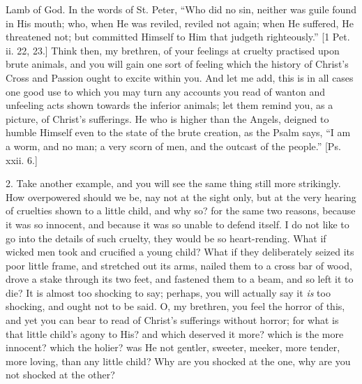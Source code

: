 Lamb of God. In the words of St. Peter, ``Who did no sin, neither
was guile found in His mouth; who, when He was reviled, reviled not
again; when He suffered, He threatened not; but committed Himself to
Him that judgeth righteously.'' [1 Pet. ii. 22, 23.] Think then,
my brethren, of your feelings at cruelty practised upon brute animals,
and you will gain one sort of feeling which the history of Christ's
Cross and Passion ought to excite within you. And let me add, this is
in all cases one good use to which you may turn any accounts you read
of wanton and unfeeling acts shown towards the inferior animals; let
them remind you, as a picture, of Christ's sufferings. He who is
higher than the Angels, deigned to humble Himself even to the state of
the brute creation, as the Psalm says, ``I am a worm, and no man;
a very scorn of men, and the outcast of the people.'' [Ps. xxii.
6.]

2. Take another example, and you will see the same thing still more
strikingly. How overpowered should we be, nay not at the sight only,
but at the very hearing of cruelties shown to a little child, and why
so? for the same two reasons, because it was so innocent, and because
it was so unable to defend itself. I do not like to go into the
details of such cruelty, they would be so heart-rending. What if
wicked men took and crucified a young child? What if they deliberately
seized its poor little frame, and stretched out its arms, nailed them
to a cross bar of wood, drove a stake through its two feet, and
fastened them to a beam, and so left it to die? It is almost too
shocking to say; perhaps, you will actually say it \emph{is} too shocking, and
ought not to be said. O, my brethren, you feel the horror of this, and
yet you can bear to read of Christ's sufferings without horror; for
what is that little child's agony to His? and which deserved it more?
which is the more innocent? which the holier? was He not gentler,
sweeter, meeker, more tender, more loving, than any little child? Why
are you shocked at the one, why are you not shocked at the other?

